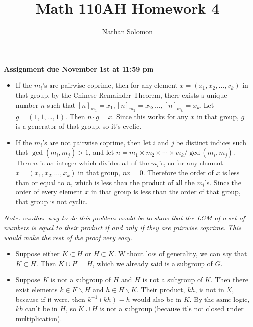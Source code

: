 \documentclass[12pt]{article}
\begin{document}
\title{Math 110AH Homework 4}
\author{Nathan Solomon}
\maketitle

\textbf{Assignment due November 1st at 11:59 pm}

\bigskip
\noindent{}\bigskip

\begin{itemize}
    \item If the $m_i$'s are pairwise coprime, then for any element $x = (x_1, x_2, \dots, x_k)$ in that group, by the Chinese Remainder Theorem, there exists a unique number $n$ such that $[n]_{m_1} = x_1, [n]_{m_2} = x_2, \dots, [n]_{m_k} = x_k$. Let $g = (1, 1, \dots, 1)$. Then $n \cdot g = x$. Since this works for any $x$ in that group, $g$ is a generator of that group, so it's cyclic.
    \item If the $m_i$'s are not pairwise coprime, then let $i$ and $j$ be distinct indices such that $ \operatorname{gcd}(m_i, m_j) > 1$, and let $n = m_1 \times m_2 \times \cdots \times m_k / \operatorname{gcd}(m_i, m_j)$. Then $n$ is an integer which divides all of the $m_i$'s, so for any element $x = (x_1, x_2, \dots, x_k)$ in that group, $nx=0$. Therefore the order of $x$ is less than or equal to $n$, which is less than the product of all the $m_i$'s. Since the order of every element $x$ in that group is less than the order of that group, that group is not cyclic.
\end{itemize}

\textit{Note: another way to do this problem would be to show that the LCM of a set of numbers is equal to their product if and only if they are pairwise coprime. This would make the rest of the proof very easy.}

\bigskip
\noindent{}\bigskip

\begin{itemize}
    \item Suppose either $K \subset H$ or $H \subset K$. Without loss of generality, we can say that $K \subset H$. Then $K \cup H = H$, which we already said is a subgroup of $G$.
    \item Suppose $K$ is not a subgroup of $H$ and $H$ is not a subgroup of $K$. Then there exist elements $k \in K \backslash H$ and $h \in H \backslash K$. Their product, $kh$, is not in $K$, because if it were, then $k^{-1}(kh)=h$ would also be in $K$. By the same logic, $kh$ can't be in $H$, so $K \cup H$ is not a subgroup (because it's not closed under multiplication).
\end{itemize}
\end{document}
